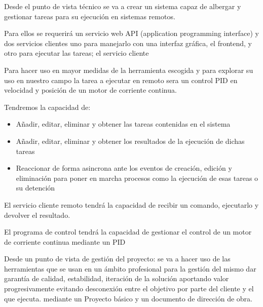 
Desde el punto de vista técnico se va a crear un sistema capaz de albergar y gestionar tareas para su ejecución en sistemas remotos.

Para ellos se requerirá un servicio web API (application programming interface) y dos servicios clientes uno para manejarlo con una interfaz gráfica, el frontend, y otro para ejecutar las tareas; el servicio cliente

Para hacer uso en mayor medidas de la herramienta escogida y para explorar su uso en nuestro campo la tarea a ejecutar en remoto sera un control PID en velocidad y posición de un motor de corriente continua.

Tendremos la capacidad de:

\begin{itemize}
	\item Añadir, editar, eliminar y obtener las tareas contenidas en el sistema
	\item Añadir, editar, eliminar y obtener los resultados de la ejecución de dichas tareas
	\item Reaccionar de forma asincrona ante los eventos de creación, edición y eliminación para poner en marcha procesos como la ejecución de esas tareas o su detención
\end{itemize} 

El servicio cliente remoto tendrá la capacidad de recibir un comando, ejecutarlo y devolver el resultado.

El programa de control tendrá la capacidad de gestionar el control de un motor de corriente continua mediante un PID

Desde un punto de vista de gestión del proyecto: se va a hacer uso de las herramientas que se usan en un ámbito profesional para la gestión del mismo dar garantía de calidad, estabilidad, iteración de la solución aportando valor progresivamente evitando desconexión entre el objetivo por parte del cliente y el que ejecuta. mediante un Proyecto básico y un documento de dirección de obra.
